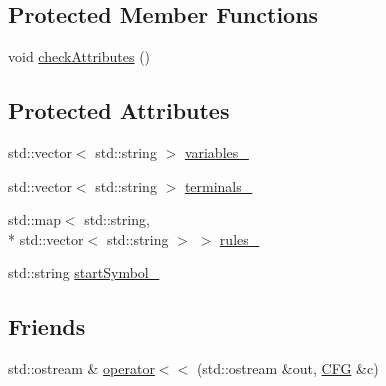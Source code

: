 \subsection*{Protected Member Functions}
\begin{DoxyCompactItemize}
\item 
void \hyperlink{classCFG_a20c962c9056a1770d71f9610df8db905}{check\-Attributes} ()
\end{DoxyCompactItemize}
\subsection*{Protected Attributes}
\begin{DoxyCompactItemize}
\item 
std\-::vector$<$ std\-::string $>$ \hyperlink{classCFG_a7369373d17b20520d7b72d43f471cda9}{variables\-\_\-}
\item 
std\-::vector$<$ std\-::string $>$ \hyperlink{classCFG_ac105b578d6237fc6ff28e54c98bbb1b8}{terminals\-\_\-}
\item 
std\-::map$<$ std\-::string, \\*
std\-::vector$<$ std\-::string $>$ $>$ \hyperlink{classCFG_a6f148c60599eec412d168d2353b7b814}{rules\-\_\-}
\item 
std\-::string \hyperlink{classCFG_a21527e2ffbb0b5bf8995ebae725858eb}{start\-Symbol\-\_\-}
\end{DoxyCompactItemize}
\subsection*{Friends}
\begin{DoxyCompactItemize}
\item 
std\-::ostream \& \hyperlink{classCFG_a125cf827399aa731591064e741ab8fb7}{operator$<$$<$} (std\-::ostream \&out, \hyperlink{classCFG}{C\-F\-G} \&c)
\end{DoxyCompactItemize}


